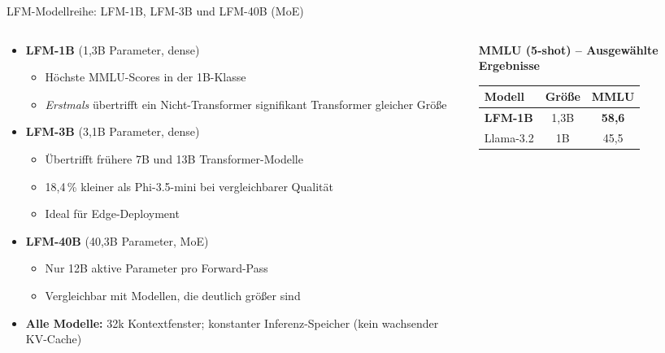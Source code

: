 \documentclass[aspectratio=1610, xcolor=dvipsnames, 9pt]{beamer}
\begin{document}
\begin{frame}{LFM-Modellreihe: LFM-1B, LFM-3B und LFM-40B (MoE)}
  \begin{columns}
    \begin{column}{0.50\textwidth}
      \begin{itemize}
        \item \textbf{LFM-1B} (1,3B Parameter, dense)
          \begin{itemize}\footnotesize
            \item Höchste MMLU-Scores in der 1B-Klasse
            \item \emph{Erstmals} übertrifft ein Nicht-Transformer signifikant Transformer gleicher Größe
          \end{itemize}
        \item \textbf{LFM-3B} (3,1B Parameter, dense)
          \begin{itemize}\footnotesize
            \item Übertrifft frühere 7B und 13B Transformer-Modelle
            \item 18,4\,\% kleiner als Phi-3.5-mini bei vergleichbarer Qualität
            \item Ideal für Edge-Deployment
          \end{itemize}
        \item \textbf{LFM-40B} (40,3B Parameter, MoE)
          \begin{itemize}\footnotesize
            \item Nur 12B aktive Parameter pro Forward-Pass
            \item Vergleichbar mit Modellen, die deutlich größer sind
          \end{itemize}
        \item \textbf{Alle Modelle:} 32k Kontextfenster; konstanter Inferenz-Speicher (kein wachsender KV-Cache)
      \end{itemize}
    \end{column}
    \begin{column}{0.48\textwidth}
      \centering
      \footnotesize
      \textbf{MMLU (5-shot) -- Ausgewählte Ergebnisse}\\[4pt]
      \begin{tabular}{@{}lcc@{}}
        \hline
        Modell & Größe & MMLU \\
        \hline
        \textbf{LFM-1B}      & 1,3B & \textbf{58,6} \\
        Llama-3.2            & 1B   & 45,5 \\

\end{tabular}
\end{column}
\end{columns}
\end{frame}
\end{document}
